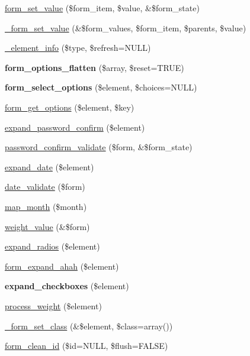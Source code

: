 \begin{CompactItemize}
\item 
\hyperlink{group__form__api_ga7635bbcb1cb510fcc0cdc265e9ddea7}{form\_\-set\_\-value} (\$form\_\-item, \$value, \&\$form\_\-state)
\item 
\hyperlink{group__form__api_gc11df4fae902c9f1d9f5aefd1ddb9a13}{\_\-form\_\-set\_\-value} (\&\$form\_\-values, \$form\_\-item, \$parents, \$value)
\item 
\hyperlink{group__form__api_gf7ae46c60bcbf2300522efa0d910f20c}{\_\-element\_\-info} (\$type, \$refresh=NULL)
\item 
\hypertarget{group__form__api_g10d2c1eda483ddf183cde64cff5a99f6}{
\textbf{form\_\-options\_\-flatten} (\$array, \$reset=TRUE)}
\label{group__form__api_g10d2c1eda483ddf183cde64cff5a99f6}

\item 
\hypertarget{group__form__api_g018022f493d295538cb6d8d312dab866}{
\textbf{form\_\-select\_\-options} (\$element, \$choices=NULL)}
\label{group__form__api_g018022f493d295538cb6d8d312dab866}

\item 
\hyperlink{group__form__api_g88bf27e1f6246789acc77dd1686e0276}{form\_\-get\_\-options} (\$element, \$key)
\item 
\hyperlink{group__form__api_gec5db42527669f2e0a0ea5f0a4d52bfa}{expand\_\-password\_\-confirm} (\$element)
\item 
\hyperlink{group__form__api_g18b2539d3eb96b30b90f73088051960e}{password\_\-confirm\_\-validate} (\$form, \&\$form\_\-state)
\item 
\hyperlink{group__form__api_ga0f7a426d54cdfcd03bf0e8f9ecbd36a}{expand\_\-date} (\$element)
\item 
\hyperlink{group__form__api_g2030fcf127a9d122a03f4844a97e8edb}{date\_\-validate} (\$form)
\item 
\hyperlink{group__form__api_g11e3cb67c8622b662acc4dff61e146a7}{map\_\-month} (\$month)
\item 
\hyperlink{group__form__api_gd80eba4897b841808cb71e6ba97603b2}{weight\_\-value} (\&\$form)
\item 
\hyperlink{group__form__api_gf7c1d7c703a78e2f7d91e0ab0a11674d}{expand\_\-radios} (\$element)
\item 
\hyperlink{group__form__api_g0632ccaef8acafed177d8bc993ab9a47}{form\_\-expand\_\-ahah} (\$element)
\item 
\hypertarget{group__form__api_ga0c3416280b2c987132d415b5e455956}{
\textbf{expand\_\-checkboxes} (\$element)}
\label{group__form__api_ga0c3416280b2c987132d415b5e455956}

\item 
\hyperlink{group__form__api_gf45ceae18e7f0206568fd7985bcfee4d}{process\_\-weight} (\$element)
\item 
\hyperlink{group__form__api_gc8800bdf25db7c100ccf2fd0dcbb25f0}{\_\-form\_\-set\_\-class} (\&\$element, \$class=array())
\item 
\hyperlink{group__form__api_gf71edb864be3bf0e932a96f1464c63bf}{form\_\-clean\_\-id} (\$id=NULL, \$flush=FALSE)
\end{CompactItemize}


